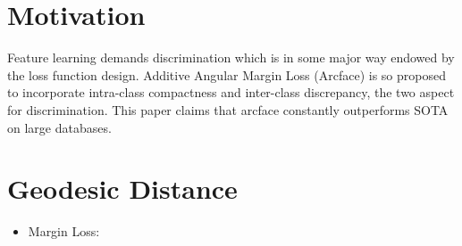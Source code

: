 \documentclass[a4paper]{article}
\begin{document}
    \section{Motivation}
        Feature learning demands discrimination which is in some major way endowed by the 
        loss function design. Additive Angular Margin Loss (Arcface) is so proposed to 
        incorporate intra-class compactness and inter-class discrepancy, the two aspect for
        discrimination. This paper claims that arcface constantly outperforms SOTA on 
        large databases.
    \section{Geodesic Distance}
        \begin{itemize}
            \item Margin Loss: 
        \end{itemize}
        
\end{document}
